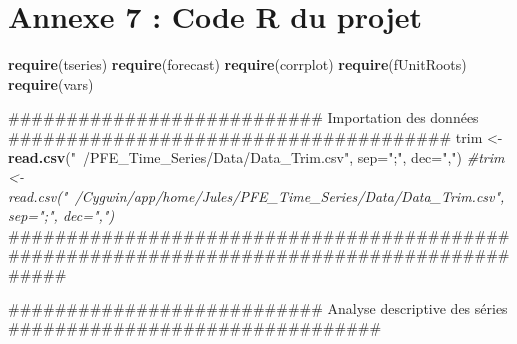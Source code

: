 \documentclass[11pt,]{article}
\newenvironment{Shaded}{\begin{snugshade}}{\end{snugshade}}
\newcommand{\KeywordTok}[1]{\textcolor[rgb]{0.13,0.29,0.53}{\textbf{{#1}}}}
\newcommand{\DataTypeTok}[1]{\textcolor[rgb]{0.13,0.29,0.53}{{#1}}}
\newcommand{\StringTok}[1]{\textcolor[rgb]{0.31,0.60,0.02}{{#1}}}
\newcommand{\CommentTok}[1]{\textcolor[rgb]{0.56,0.35,0.01}{\textit{{#1}}}}
\newcommand{\NormalTok}[1]{{#1}}
\begin{document}
\section{Annexe 7 : Code R du projet}\label{annexe-7-code-r-du-projet}

\begin{Shaded}
\begin{Highlighting}[]
\KeywordTok{require}\NormalTok{(tseries)}
\KeywordTok{require}\NormalTok{(forecast)}
\KeywordTok{require}\NormalTok{(corrplot)}
\KeywordTok{require}\NormalTok{(fUnitRoots)}
\KeywordTok{require}\NormalTok{(vars)}


\NormalTok{########################### Importation des données  ######################################}
\NormalTok{trim <-}\StringTok{ }\KeywordTok{read.csv}\NormalTok{(}\StringTok{"~/PFE_Time_Series/Data/Data_Trim.csv"}\NormalTok{, }\DataTypeTok{sep=}\StringTok{";"}\NormalTok{, }\DataTypeTok{dec=}\StringTok{","}\NormalTok{)}
\CommentTok{#trim <- read.csv("~/Cygwin/app/home/Jules/PFE_Time_Series/Data/Data_Trim.csv", sep=";", dec=",")}
\NormalTok{###########################################################################################}

\NormalTok{########################### Analyse descriptive des séries ################################}


\end{Highlighting}
\end{Shaded}
\end{document}
